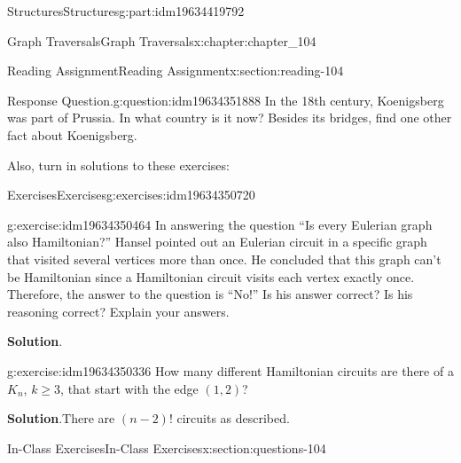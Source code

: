 \documentclass[oneside,10pt,]{book}
\newcommand{\blocktitlefont}{\relax}
\numberwithin{equation}{section}
\begin{document}
\begin{partptx}{Structures}{}{Structures}{}{}{g:part:idm19634419792}
\begin{chapterptx}{Graph Traversals}{}{Graph Traversals}{}{}{x:chapter:chapter_104}
\begin{sectionptx}{Reading Assignment}{}{Reading Assignment}{}{}{x:section:reading-104}
\begin{question}{Response Question.}{g:question:idm19634351888}%
In the 18th century, Koenigsberg was  part of Prussia. In what country is it now? Besides its bridges, find one other fact about Koenigsberg.%
\end{question}
Also, turn in solutions to these exercises:%
%
%
\typeout{************************************************}
\typeout{************************************************}
%
\begin{exercises-subsection-numberless}{Exercises}{}{Exercises}{}{}{g:exercises:idm19634350720}
\par\medskip\noindent%
%
\begin{exercisegroup}
\begin{divisionexerciseeg}{1}{}{}{g:exercise:idm19634350464}%
In answering the question ``Is every Eulerian graph also Hamiltonian?'' Hansel pointed out an Eulerian circuit in a specific graph that visited several vertices more than once.  He concluded that this graph can't be Hamiltonian since a Hamiltonian circuit visits each vertex exactly once. Therefore, the answer to the question is ``No!'' Is his answer correct? Is his reasoning correct?  Explain your answers.%
\par\smallskip%
\noindent\textbf{\blocktitlefont Solution}.\hypertarget{g:solution:idm19634348752}{}\quad{}%
\end{divisionexerciseeg}%
\begin{divisionexerciseeg}{2}{}{}{g:exercise:idm19634350336}%
How many different Hamiltonian circuits are there of a \(K_n\), \(k \geq 3\), that start with the edge \((1,2)\)?%
\par\smallskip%
\noindent\textbf{\blocktitlefont Solution}.\hypertarget{g:solution:idm19634348496}{}\quad{}There are \((n-2)!\) circuits as described.%
\end{divisionexerciseeg}%
\end{exercisegroup}
\par\medskip\noindent
\end{exercises-subsection-numberless}
\end{sectionptx}
%
%
\typeout{************************************************}
\typeout{************************************************}
%
\begin{sectionptx}{In-Class Exercises}{}{In-Class Exercises}{}{}{x:section:questions-104}
%
%
%
\typeout{************************************************}

\end{sectionptx}
\end{chapterptx}
\end{partptx}
\end{document}
